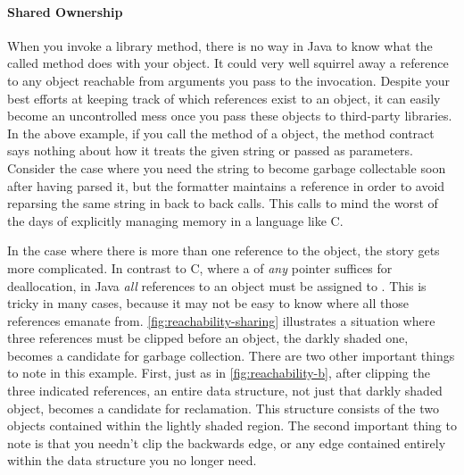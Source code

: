 \paragraph{Shared Ownership}

When you invoke a library method, there is no way in Java to know what the called
method does with your object. It could very well squirrel away a reference to any
object reachable from arguments you pass to the invocation. Despite your best
efforts at keeping track of which references exist to an object, it can easily
become an uncontrolled mess once you pass these objects to third-party libraries.
In the above example, if you call the  method of a
 object, the method contract says nothing about how it
treats the given string or  passed as parameters. 
Consider the case where you need the string to become garbage collectable soon
after having parsed it, but the formatter maintains a reference in order to avoid
reparsing the same string in back to back calls. This calls
to mind the worst of the days of explicitly managing memory in a language like C.

In the case where there is more than one reference to the object, the story gets
more complicated. In contrast to C, where a  of \emph{any} pointer
suffices for deallocation, in Java \emph{all} references to an object must be
assigned to . This is tricky in many cases, because it may not be easy
to know where all those references emanate from.
\autoref{fig:reachability-sharing} illustrates a situation where three references
must be clipped before an object, the darkly shaded one, becomes a candidate for
garbage collection. There are two other important things to note in this example.
First, just as in \autoref{fig:reachability-b}, after clipping the three
indicated references, an entire data structure, not just that darkly shaded
object, becomes a candidate for reclamation. This structure consists of the two
objects contained within the lightly shaded region. The second important thing to
note is that you needn't clip the backwards edge, or any edge contained entirely
within the data structure you no longer need.

